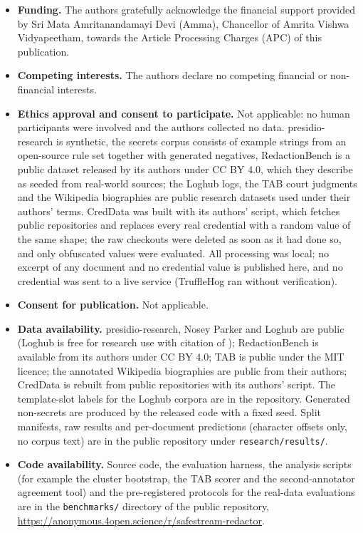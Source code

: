 \documentclass[pdflatex,sn-mathphys-num]{sn-jnl}
\newcommand{\repolink}{\url{https://anonymous.4open.science/r/safestream-redactor}}
\newcommand{\repolink}{\url{https://github.com/MounishSenisetty/SafeStream-Redactor}}
\theoremstyle{\ssThmStyle}
\theoremstyle{\ssDefStyle}
\begin{document}
\begin{itemize}
\ifanonymous\else
\item \textbf{Funding.} The authors gratefully acknowledge the financial support provided by Sri Mata Amritanandamayi Devi (Amma), Chancellor of Amrita Vishwa Vidyapeetham, towards the Article Processing Charges (APC) of this publication.
\fi
\item \textbf{Competing interests.} The authors declare no competing financial or non-financial interests.
\item \textbf{Ethics approval and consent to participate.} Not applicable: no human participants were involved and the authors collected no data. presidio-research is synthetic, the secrets corpus consists of example strings from an open-source rule set together with generated negatives, RedactionBench is a public dataset released by its authors under CC BY 4.0, which they describe as seeded from real-world sources; the Loghub logs, the TAB court judgments and the Wikipedia biographies are public research datasets used under their authors' terms. CredData was built with its authors' script, which fetches public repositories and replaces every real credential with a random value of the same shape; the raw checkouts were deleted as soon as it had done so, and only obfuscated values were evaluated. All processing was local; no excerpt of any document and no credential value is published here, and no credential was sent to a live service (TruffleHog ran without verification).
\item \textbf{Consent for publication.} Not applicable.
\item \textbf{Data availability.} presidio-research, Nosey Parker and Loghub are public (Loghub is free for research use with citation of \cite{zhu2023loghub}); RedactionBench is available from its authors under CC BY 4.0; TAB \cite{pilan2022tab} is public under the MIT licence; the annotated Wikipedia biographies \cite{papadopoulou2022bootstrapping} are public from their authors; CredData \cite{creddata2021} is rebuilt from public repositories with its authors' script. The template-slot labels for the Loghub corpora are in the repository. Generated non-secrets are produced by the released code with a fixed seed. Split manifests, raw results and per-document predictions (character offsets only, no corpus text) are in the public repository under \texttt{research/results/}.
\item \textbf{Code availability.} Source code, the evaluation harness, the analysis scripts (for example the cluster bootstrap, the TAB scorer and the second-annotator agreement tool) and the pre-registered protocols for the real-data evaluations are in the \texttt{benchmarks/} directory of the public repository, \repolink{}.

\end{itemize}
\end{document}
